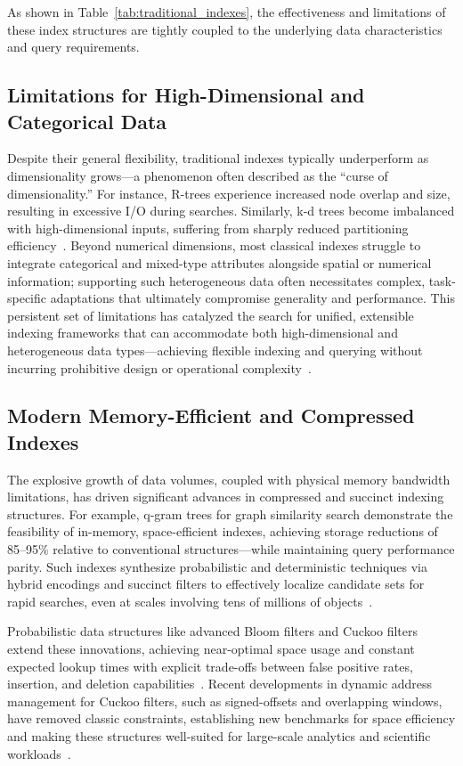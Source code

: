 As shown in Table~\ref{tab:traditional_indexes}, the effectiveness and limitations of these index structures are tightly coupled to the underlying data characteristics and query requirements.

\subsection{Limitations for High-Dimensional and Categorical Data}

Despite their general flexibility, traditional indexes typically underperform as dimensionality grows—a phenomenon often described as the “curse of dimensionality.” For instance, R-trees experience increased node overlap and size, resulting in excessive I/O during searches. Similarly, k-d trees become imbalanced with high-dimensional inputs, suffering from sharply reduced partitioning efficiency~\cite{ref111,ref112}. Beyond numerical dimensions, most classical indexes struggle to integrate categorical and mixed-type attributes alongside spatial or numerical information; supporting such heterogeneous data often necessitates complex, task-specific adaptations that ultimately compromise generality and performance. This persistent set of limitations has catalyzed the search for unified, extensible indexing frameworks that can accommodate both high-dimensional and heterogeneous data types—achieving flexible indexing and querying without incurring prohibitive design or operational complexity~\cite{ref111,ref112}.

\subsection{Modern Memory-Efficient and Compressed Indexes}

The explosive growth of data volumes, coupled with physical memory bandwidth limitations, has driven significant advances in compressed and succinct indexing structures. For example, q-gram trees for graph similarity search demonstrate the feasibility of in-memory, space-efficient indexes, achieving storage reductions of 85--95\% relative to conventional structures—while maintaining query performance parity. Such indexes synthesize probabilistic and deterministic techniques via hybrid encodings and succinct filters to effectively localize candidate sets for rapid searches, even at scales involving tens of millions of objects~\cite{ref80}. 

Probabilistic data structures like advanced Bloom filters and Cuckoo filters extend these innovations, achieving near-optimal space usage and constant expected lookup times with explicit trade-offs between false positive rates, insertion, and deletion capabilities~\cite{ref81,ref82}. Recent developments in dynamic address management for Cuckoo filters, such as signed-offsets and overlapping windows, have removed classic constraints, establishing new benchmarks for space efficiency and making these structures well-suited for large-scale analytics and scientific workloads~\cite{ref82}.
 
